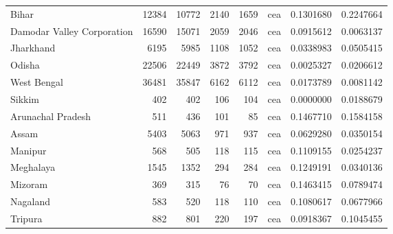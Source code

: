 \begin{tabular}{lrrrrlrr}
Bihar & 12384 & 10772 & 2140 & 1659 & cea & 0.1301680 & 0.2247664\\
Damodar Valley Corporation & 16590 & 15071 & 2059 & 2046 & cea & 0.0915612 & 0.0063137\\
Jharkhand & 6195 & 5985 & 1108 & 1052 & cea & 0.0338983 & 0.0505415\\
Odisha & 22506 & 22449 & 3872 & 3792 & cea & 0.0025327 & 0.0206612\\
\addlinespace
West Bengal & 36481 & 35847 & 6162 & 6112 & cea & 0.0173789 & 0.0081142\\
Sikkim & 402 & 402 & 106 & 104 & cea & 0.0000000 & 0.0188679\\
Arunachal Pradesh & 511 & 436 & 101 & 85 & cea & 0.1467710 & 0.1584158\\
Assam & 5403 & 5063 & 971 & 937 & cea & 0.0629280 & 0.0350154\\
Manipur & 568 & 505 & 118 & 115 & cea & 0.1109155 & 0.0254237\\
\addlinespace
Meghalaya & 1545 & 1352 & 294 & 284 & cea & 0.1249191 & 0.0340136\\
Mizoram & 369 & 315 & 76 & 70 & cea & 0.1463415 & 0.0789474\\
Nagaland & 583 & 520 & 118 & 110 & cea & 0.1080617 & 0.0677966\\
Tripura & 882 & 801 & 220 & 197 & cea & 0.0918367 & 0.1045455\\
\bottomrule
\end{tabular}
